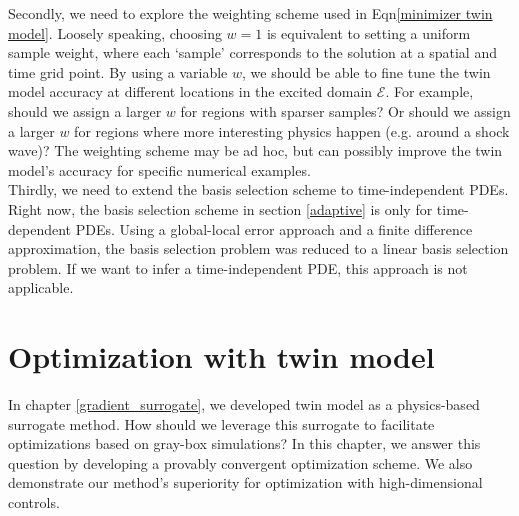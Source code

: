\documentclass[a4paper,onecolumn]{article}
\theoremstyle{remark}
\begin{document}
\noindent Secondly, we need to explore the weighting scheme used in Eqn\eqref{minimizer twin model}.
Loosely speaking, choosing $w=1$ is equivalent to setting a uniform sample weight, where each `sample'
corresponds to the solution at a spatial and time grid point.
By using a variable $w$, we should be able to fine tune the twin model accuracy at different locations
in the excited domain $\mathcal{E}$. For example, should we assign a larger $w$
for regions with sparser samples? Or should we assign a larger $w$ for regions where
more interesting physics happen (e.g. around a shock wave)?
The weighting scheme may be ad hoc, but can possibly 
improve the twin model's accuracy for specific numerical examples.\\



\noindent Thirdly, we need to extend the basis selection scheme to time-independent PDEs.
Right now, the basis selection scheme in section \ref{adaptive} is only for time-dependent PDEs.
Using a global-local error approach and a finite difference approximation, the basis
selection problem was reduced to a linear basis selection problem. If we want to infer
a time-independent PDE, this approach is not applicable. 

\newpage
\section{Optimization with twin model}
\noindent In chapter \ref{gradient_surrogate},
we developed twin model as a physics-based surrogate method.
How should we leverage this surrogate to facilitate optimizations based on gray-box simulations?
In this chapter, we answer this question by developing a provably convergent optimization scheme.
We also demonstrate our method's superiority for optimization with high-dimensional controls.\\
\end{document}
